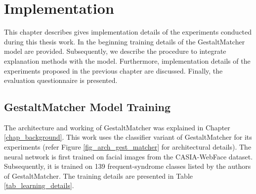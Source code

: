 \documentclass[../report.tex]{subfiles}
\begin{document}
    \chapter{Implementation}\label{ch_implementation}
    This chapter describes gives implementation details of the experiments conducted during this thesis work. In the beginning training details of the GestaltMatcher model are provided. Subsequently, we describe the procedure to integrate explanation methods with the model. Furthermore, implementation details of the experiments proposed in the previous chapter are discussed. Finally, the evaluation questionnaire is presented.
	\section{GestaltMatcher Model Training}
	The architecture and working of GestaltMatcher was explained in Chapter \ref{chap_background}. This work uses the classifier variant of GestaltMatcher for its experiments (refer Figure \ref{fig_arch_gest_matcher} for architectural details). The neural network is first trained on facial images from the CASIA-WebFace \cite{yi2014learning} dataset. Subsequently, it is trained on 139 frequent-syndrome classes listed by the authors of GestaltMatcher. The training details are presented in Table \ref{tab_learning_details}.
	
\end{document}
